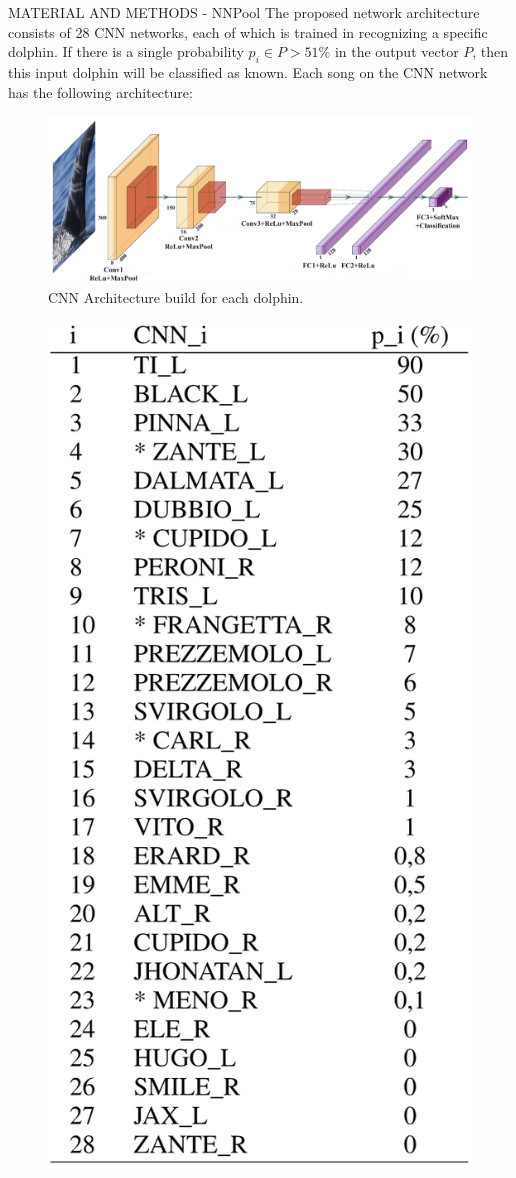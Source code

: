 \begin{frame}{MATERIAL AND METHODS - NNPool}
    The proposed network architecture consists of 28 CNN networks, each of which is trained in recognizing a specific dolphin. If there is a single probability $p_i\in P > 51\%$ in the output vector $P$, then this input dolphin will be classified as known. Each song on the CNN network has the following architecture:
    \begin{minipage}{\linewidth}
        \centering
        \begin{minipage}{0.47\linewidth}
            \begin{figure}[h!]
                \centering
                \includegraphics[width = \linewidth]{images/paper10/NNPool Architecture.png}
                \centering
                \caption{CNN Architecture build for each dolphin.}
                \label{fig:CNNDol}
            \end{figure} 
        \end{minipage}
        \hspace{0.05\linewidth}
        \begin{minipage}{0.45\linewidth}
            \begin{figure}[h!]
                \centering
                \includegraphics[width = 0.5\linewidth]{images/paper10/NNPool output.png}

\end{figure}
\end{minipage}
\end{minipage}
\end{frame}
